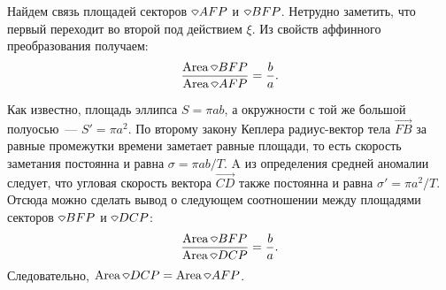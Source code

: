 Найдем связь площадей секторов $\sector AFP$ и $\sector BFP$. Нетрудно заметить, что первый переходит во второй под действием $\xi$. Из свойств аффинного преобразования получаем:
\begin{equation*}
	\frac{\area \sector BFP}{\area \sector AFP} = \frac{b}{a}.
\end{equation*}


Как известно, площадь эллипса $S = \pi ab$, а окружности с той же большой полуосью~---  $S' = \pi a^2$. По второму закону Кеплера радиус-вектор тела $\overrightarrow{FB}$ за равные промежутки времени заметает равные площади, то есть скорость заметания постоянна и равна $\sigma = \pi a b / T$. A из определения средней аномалии следует, что угловая скорость вектора $\overrightarrow{CD}$ также постоянна и равна $\sigma' = \pi a^2 / T$. Отсюда можно сделать вывод о следующем соотношении между площадями секторов $\sector BFP$ и $ \sector DCP$:
\begin{equation*}
	\frac{\area \sector BFP}{\area \sector DCP} = \frac{b}{a}.
\end{equation*}
Следовательно, $\area \sector DCP = \area \sector AFP$.

